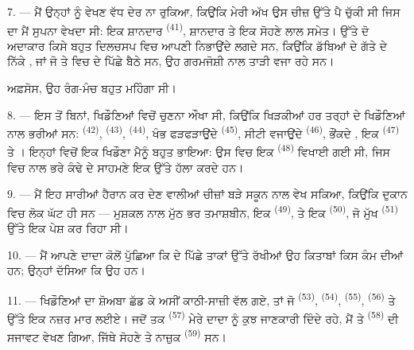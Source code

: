 7. --- ਮੈਂ ਉਨ੍ਹਾਂ ਨੂੰ ਵੇਖਣ ਵੱਧ ਦੇਰ ਨਾ ਰੁਕਿਆ, ਕਿਉਂਕਿ ਮੇਰੀ ਅੱਖ ਉਸ ਚੀਜ਼ ਉੱਤੇ ਪੈ ਚੁੱਕੀ
ਸੀ ਜਿਸ ਦਾ ਮੈਂ ਸੁਪਨਾ ਵੇਖਦਾ ਸੀ: ਇਕ ਸ਼ਾਨਦਾਰ 
\textsuperscript{(41)}, ਸ਼ਾਨਦਾਰ  ਤੇ ਇਕ ਸੋਹਣੇ ਲਾਲ
 ਸਮੇਤ।  ਉੱਤੇ ਦੋ ਅਦਾਕਾਰ ਕਿਸੇ ਬਹੁਤ ਦਿਲਚਸਪ
 ਵਿਚ ਆਪਣੀ  ਨਿਭਾਉਂਦੇ ਲਗਦੇ ਸਨ, ਕਿਉਂਕਿ ਡੱਬਿਆਂ ਦੇ ਗੱਤੇ
ਦੇ ਨਿੱਕੇ , ਜਾਂ ਜੋ  ਤੇ
 ਵਿਚ  ਦੇ ਪਿੱਛੇ ਬੈਠੇ ਸਨ, ਉਹ ਗਰਮਜੋਸ਼ੀ ਨਾਲ
ਤਾੜੀ ਵਜਾ ਰਹੇ ਸਨ।

ਅਫ਼ਸੋਸ, ਉਹ ਰੰਗ-ਮੰਚ ਬਹੁਤ ਮਹਿੰਗਾ ਸੀ।

8. --- ਇਸ ਤੋਂ ਬਿਨਾਂ, ਖਿਡੌਣਿਆਂ ਵਿਚੋਂ ਚੁਣਨਾ ਔਖਾ ਸੀ, ਕਿਉਂਕਿ ਖਿੜਕੀਆਂ ਹਰ ਤਰ੍ਹਾਂ ਦੇ
ਖਿਡੌਣਿਆਂ ਨਾਲ ਭਰੀਆਂ ਸਨ:  \textsuperscript{(42)},
 \textsuperscript{(43)},  \textsuperscript{(44)},
ਖੰਭ ਫੜਫੜਾਉਂਦੇ  \textsuperscript{(45)}, ਸੀਟੀ ਵਜਾਉਂਦੇ
 \textsuperscript{(46)}, ਭੌਂਕਦੇ , ਇਕ
 \textsuperscript{(47)} ਤੇ । ਇਨ੍ਹਾਂ ਵਿਚੋਂ ਇਕ
ਖਿਡੌਣਾ ਮੈਨੂੰ ਬਹੁਤ ਭਾਇਆ: ਉਸ ਵਿਚ ਇਕ  \textsuperscript{(48)}
ਵਿਖਾਈ ਗਈ ਸੀ, ਜਿਸ ਵਿਚ  ਨਾਲ ਭਰੇ ਕੰਢੇ ਦੇ ਸਾਹਮਣੇ
 ਇਕ  ਉੱਤੇ ਹੱਲਾ ਕਰਦੇ ਹਨ।


9. --- ਮੈਂ ਇਹ ਸਾਰੀਆਂ ਹੈਰਾਨ ਕਰ ਦੇਣ ਵਾਲੀਆਂ ਚੀਜ਼ਾਂ ਬੜੇ ਸਕੂਨ ਨਾਲ ਵੇਖ ਸਕਿਆ, ਕਿਉਂਕਿ
ਦੁਕਾਨ ਵਿਚ ਲੋਕ ਘੱਟ ਹੀ ਸਨ — ਮੁਸ਼ਕਲ ਨਾਲ ਮੁੱਠ ਭਰ ਤਮਾਸ਼ਬੀਨ, ਇਕ
 \textsuperscript{(49)}, ਤੇ ਇਕ 
\textsuperscript{(50)}, ਜੋ ਮੁੱਖ  \textsuperscript{(51)} ਉੱਤੇ ਇਕ
 ਪੇਸ਼ ਕਰ ਰਿਹਾ ਸੀ।

10. --- ਮੈਂ ਆਪਣੇ ਦਾਦਾ ਕੋਲੋਂ ਪੁੱਛਿਆ ਕਿ  ਦੇ ਪਿੱਛੇ ਤਾਕਾਂ ਉੱਤੇ ਰੱਖੀਆਂ
ਉਹ ਕਿਤਾਬਾਂ ਕਿਸ ਕੰਮ ਦੀਆਂ ਹਨ; ਉਨ੍ਹਾਂ ਦੱਸਿਆ ਕਿ ਉਹ  ਹਨ।

\VUsaut{3.6mm}
\VUsaut{2.8mm}

11. --- ਖਿਡੌਣਿਆਂ ਦਾ ਸ਼ੋਅਬਾ ਛੱਡ ਕੇ ਅਸੀਂ ਕਾਠੀ-ਸਾਜ਼ੀ ਵੱਲ ਗਏ, ਤਾਂ ਜੋ 
\textsuperscript{(53)},  \textsuperscript{(54)}, 
\textsuperscript{(55)},  \textsuperscript{(56)} ਤੇ
 ਉੱਤੇ ਇਕ ਨਜ਼ਰ ਮਾਰ ਲਈਏ। ਜਦੋਂ ਤਕ
 \textsuperscript{(57)} ਮੇਰੇ ਦਾਦਾ ਨੂੰ ਕੁਝ ਜਾਣਕਾਰੀ ਦਿੰਦੇ
ਰਹੇ, ਮੈਂ  ਤੇ  \textsuperscript{(58)}
ਦੀ ਸਜਾਵਟ ਵੇਖਣ ਗਿਆ, ਜਿੱਥੇ ਸੋਹਣੇ  ਤੇ ਨਾਜ਼ੁਕ 
\textsuperscript{(59)} ਸਨ।

